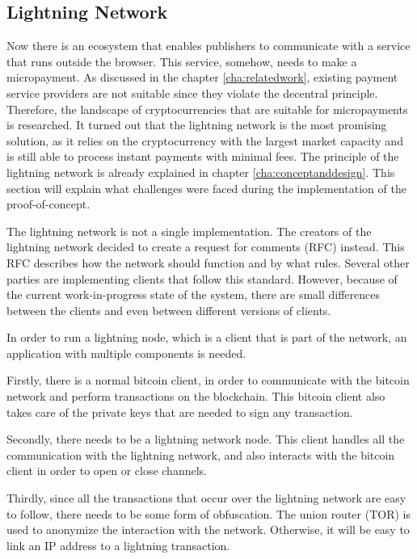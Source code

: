 \subsection{Lightning Network}
\label{sec:lightningnetwork}

Now there is an ecosystem that enables publishers to communicate with a service that runs outside the browser. This service, somehow, needs to make a micropayment. As discussed in the chapter \ref{cha:relatedwork}, existing payment service providers are not suitable since they violate the decentral principle. Therefore, the landscape of cryptocurrencies that are suitable for micropayments is researched. It turned out that the lightning network is the most promising solution, as it relies on the cryptocurrency with the largest market capacity and is still able to process instant payments with minimal fees. The principle of the lightning network is already explained in chapter \ref{cha:conceptanddesign}. This section will explain what challenges were faced during the implementation of the proof-of-concept.

The lightning network is not a single implementation. The creators of the lightning network decided to create a request for comments (RFC) instead. This RFC describes how the network should function and by what rules. Several other parties are implementing clients that follow this standard. However, because of the current work-in-progress state of the system, there are small differences between the clients and even between different versions of clients. 

In order to run a lightning node, which is a client that is part of the network, an application with multiple components is needed. 

Firstly, there is a normal bitcoin client, in order to communicate with the bitcoin network and perform transactions on the blockchain. This bitcoin client also takes care of the private keys that are needed to sign any transaction.

Secondly, there needs to be a lightning network node. This client handles all the communication with the lightning network, and also interacts with the bitcoin client in order to open or close channels. 

Thirdly, since all the transactions that occur over the lightning network are easy to follow, there needs to be some form of obfuscation. The union router (TOR) is used to anonymize the interaction with the network. Otherwise, it will be easy to link an IP address to a lightning transaction.

